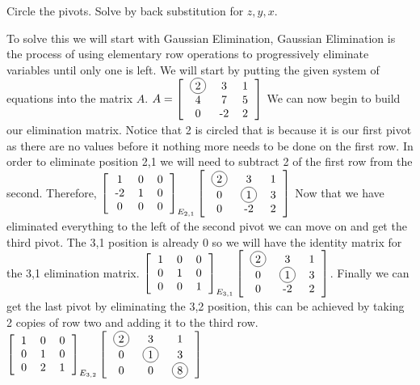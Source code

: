 \documentclass[]{exam}
\newcommand {\mb}{\begin{bmatrix}\begin{tabular}{ccc}}
\newcommand {\me} {\end{tabular} \end{bmatrix}}
\newcommand*\circled[1]{\tikz[baseline=(char.base)]{
            \node[shape=circle,draw,inner sep=2pt] (char) {#1};}}
\begin{document}
\begin{questions}
	Circle the pivots. Solve by back substitution for $z, y, x$. 
	
	\begin{solution}
	    To solve this we will start with Gaussian Elimination, Gaussian Elimination is the process of using elementary row operations to progressively eliminate variables until only one is left. We will start by putting the given system of equations into the matrix $A$. $A=\mb
	    \circled{2} & 3 & 1 \\
	    4 & 7  & 5 \\
	    0 & -2 & 2 
	    \me$
	    We can now begin to build our elimination matrix.  Notice that 2 is circled that is because it is our first pivot as there are no values before it nothing more needs to be done on the first row. In order to eliminate position 2,1 we will need to subtract 2 of the first row from the second.  Therefore, $\mb 1 & 0 & 0 \\
	    -2 & 1 & 0 \\
	    0 & 0 & 0  \\
	   \me_{E_{2,1}}
	   \mb 
	   \circled{2} & 3 & 1 \\
	    0 & \circled{1}  & 3 \\
	    0 & -2 & 2
	   \me$
	   Now that we have eliminated everything to the left of the second pivot we can move on and get the third pivot.  The 3,1 position is already 0 so we will have the identity matrix for the 3,1 elimination matrix.  $\mb 1 & 0 & 0 \\
	    0 & 1 & 0 \\
	    0 & 0 & 1  \\
	   \me_{E_{3,1}}
	   \mb 
	   \circled{2} & 3 & 1 \\
	    0 & \circled{1}  & 3 \\
	    0 & -2 & 2
	   \me$.
	   Finally we can get the last pivot by eliminating the 3,2 position, this can be achieved by taking 2 copies of row two and adding it to the third row.   $\mb 1 & 0 & 0 \\
	    0 & 1 & 0 \\
	    0 & 2 & 1  \\
	   \me_{E_{3,2}}
	   \mb 
	   \circled{2} & 3 & 1 \\
	    0 & \circled{1} & 3 \\
	    0 & 0 & \circled{8}
	   \me$
	   

\end{solution}
\end{questions}
\end{document}
